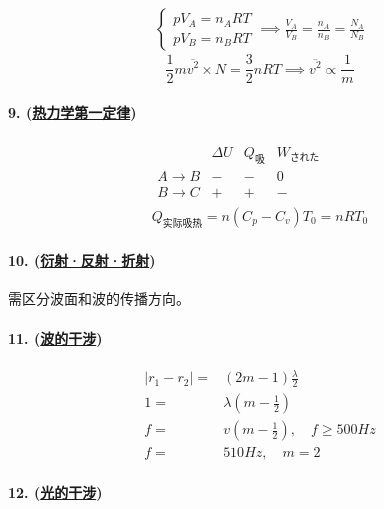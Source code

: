 \begin{gather*}
    \begin{cases}
        pV_A=n_ART\\
        pV_B=n_BRT
    \end{cases}\implies
    \frac{V_A}{V_B}=\frac{n_A}{n_B}=\frac{N_A}{N_B}
\end{gather*}
\begin{equation*}
    \frac12m\overline{v^2}\times N=\frac32nRT\implies
    \overline{v^2}\propto\frac1m
\end{equation*}

\paragraph{9. (\hyperref[subsec:热力学第一定律]{热力学第一定律})}

\begin{gather*}
    \begin{array}{c|ccc}
        & \Delta U & Q_\textrm{吸} & W_\textrm{された} \\\hline
        A\to B & - & - & 0 \\
        B\to C & + & + & -
    \end{array}\\
    Q_\textrm{实际吸热}=n(C_p-C_v)T_0=nRT_0
\end{gather*}

\paragraph{10. (\hyperref[subsec:衍射·反射·折射]{衍射·反射·折射})} 需区分波面和波的传播方向。
\paragraph{11. (\hyperref[subsec:波的干涉]{波的干涉})}

\begin{align*}
    |r_1-r_2|=&(2m-1)\frac\lambda2\\
    1=&\lambda\left(m-\frac12\right)\\
    f=&v\left(m-\frac12\right),\quad f\ge500Hz\\
    f=&510Hz,\quad m=2
\end{align*}

\paragraph{12. (\hyperref[subsec:光的干涉]{光的干涉})}

